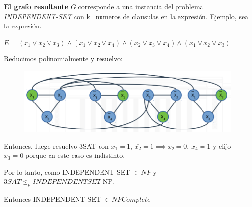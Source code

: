 \documentclass{article}
\begin{document}
\textbf{El grafo resultante }\(G\) corresponde a una instancia del problema \textit{INDEPENDENT-SET} 
con k=numeros de clausulas en la expresión. Ejemplo, sea la expresión:

\(E=(x_1 \lor x_2 \lor x_3) \land (\overline{x_1} \lor \overline{x_2} \lor \overline{x_4}) 
    \land (\overline{x_2} \lor \overline{x_3} \lor x_4) 
    \land (\overline{x_1} \lor \overline{x_2} \lor x_3)\)

Reducimos polinomialmente y resuelvo:
\begin{figure}[h!]
    \includegraphics[scale=0.4]{imagenes/ejemplo-reduccion-3sat.png}
\end{figure}

Entonces, luego resuelvo 3SAT con \(x_1 = 1\), \(\overline{x_2} = 1 \implies x_2=0\), 
\(x_4=1\) y elijo \(x_3=0\) porque en este caso es indistinto.

Por lo tanto, como INDEPENDENT-SET \(\in NP\) y \(3SAT \leq_p INDEPENDENTSET\) NP.

Entonces INDEPENDENT-SET \(\in NPComplete\)
\end{document}
